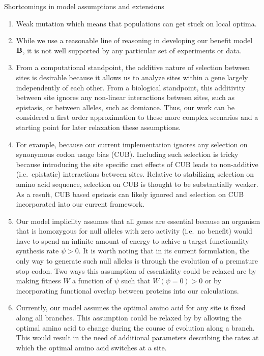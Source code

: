 \documentclass{article}
\newcommand{\Func}{\ensuremath{\text{\textbf{B}}}\xspace}
\begin{document}
Shortcomings in model assumptions and extensions
\begin{enumerate}
\item Weak mutation which means that populations can get stuck on local optima.
\item While we use a reasonable line of reasoning in developing our benefit model \Func, it is not well supported by any particular set of experiments or data.
\item From a computational standpoint, the additive nature of selection between sites is desirable because it allows us to analyze sites within a gene largely independently of each other.
  From a biological standpoint, this additivity between site ignores any non-linear interactions between sites, such as epistasis, or between alleles, such as domiance.  Thus, our work can be considered a first order approximation to these more complex scenarios and a starting point for later relaxation these assumptions.
\item For example, because our current implementation ignores any selection on synonymous codon usage bias (CUB).
  Including such selection is tricky because introducing the site specific cost effects of CUB leads to non-additive (i.e.~epistatic) interactions between sites.  Relative to stabilizing selection on amino acid sequence, selection on CUB is thought to be substantially weaker.
  As a result, CUB based epstasis can likely ignored and selection on CUB incorporated into our current framework.
\item Our model implicilty assumes that all genes are essential because an organism that is homozygous for null alleles with zero activity (i.e.~no benefit) would have to spend an infinite amount of energy to achive a target functionality synthesis rate $\psi > 0$.
  It is worth noting that in its current formulation, the only way to generate such null alleles is through the evolution of a premature stop codon.
  Two ways this assumption of essentiality could be relaxed are by making fitness $W$ a function of $\psi$ such that  $W(\psi = 0) > 0$ or by incorporating functional overlap between proteins into our calculations.
\item Currently, our model assumes the optimal amino acid for any site is fixed along all branches.
  This assumption could be relaxed by by allowing the optimal amino acid to change during the course of evolution along a branch.
  This would result in the need of additional parameters describing the rates at which the optimal amino acid switches at a site.

\end{enumerate}
\end{document}
